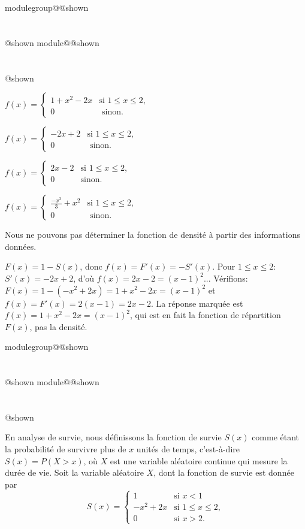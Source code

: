 \documentclass{Evaluation}
\makeatletter
\newcommand{\currentmodulekey}{}
\newcommand{\currentmoduletitle}{}
\newcommand{\currentgroupkey}{}
\newcommand{\currentgrouptitle}{}
\newcommand{\showmoduleifneeded}{%
  \ifx\currentgroupkey\empty\else
    \expandafter\ifx\csname modulegroup@\currentgroupkey @shown\endcsname\relax
      \section*{\currentgrouptitle}%
      \expandafter\gdef\csname modulegroup@\currentgroupkey @shown\endcsname{1}%
    \fi
  \fi
  \expandafter\ifx\csname module@\currentmodulekey @shown\endcsname\relax
    \section*{\currentmoduletitle}%
    \expandafter\gdef\csname module@\currentmodulekey @shown\endcsname{1}%
  \fi
}
\newenvironment{A24}{\showmoduleifneeded}{}
\newenvironment{H25}{\showmoduleifneeded}{}
\makeatother
\begin{document}
\begin{questions}
\begin{A24}
\begin{checkboxes}
\correctchoice $ f(x) = \left\{
			\begin{array}{ll}
   \displaystyle 1+x^2-2x& \text{si } 1\leq x\leq 2, \\
			0 & \mbox{ sinon.}
			\end{array}
			\right. $

\choice $ f(x) = \left\{
			\begin{array}{ll}
   \displaystyle -2x+2& \text{si } 1\leq x\leq 2, \\
			0 & \mbox{ sinon.}
			\end{array}
			\right. $

\choice $ f(x) = \left\{
			\begin{array}{ll}
   \displaystyle 2x-2& \text{si } 1\leq x\leq 2, \\
			0 & \mbox{sinon.}
			\end{array}
			\right. $


\choice $ f(x) = \left\{
			\begin{array}{ll}
   \displaystyle \frac{-x^3}{3}+x^2& \text{si } 1\leq x\leq 2, \\
			0 &  \mbox{ sinon. }
			\end{array}
			\right. $



\choice Nous ne pouvons pas déterminer la fonction de densité à partir des informations données.

\end{checkboxes}

\begin{solution}
    $F(x)=1-S(x)$, donc $f(x)=F'(x)=-S'(x)$. Pour $1\leq x\leq 2$: $S'(x)=-2x+2$, d'où $f(x)=2x-2=(x-1)^2$... Vérifions: $F(x)=1-(-x^2+2x)=1+x^2-2x=(x-1)^2$ et $f(x)=F'(x)=2(x-1)=2x-2$. La réponse marquée est $f(x)=1+x^2-2x=(x-1)^2$, qui est en fait la fonction de répartition $F(x)$, pas la densité.
\end{solution}
\end{A24}

\begin{H25}
\question {} %
En analyse de survie, nous définissons la fonction de survie $S(x)$ comme étant la probabilité de survivre plus de $x$ unités de temps, c'est-à-dire $S(x)=P(X>x)$, où $X$ est une variable aléatoire continue qui mesure la durée de vie.  Soit la variable aléatoire $X$, dont la fonction de survie est donnée par
\[ S(x) =
\begin{cases}
1 & \text{si } x<1\\
   \displaystyle -x^2+2x& \text{si } 1\leq x\leq 2, \\
    0 & \text{si } x>2.
\end{cases}
\]


\end{H25}
\end{questions}
\end{document}
